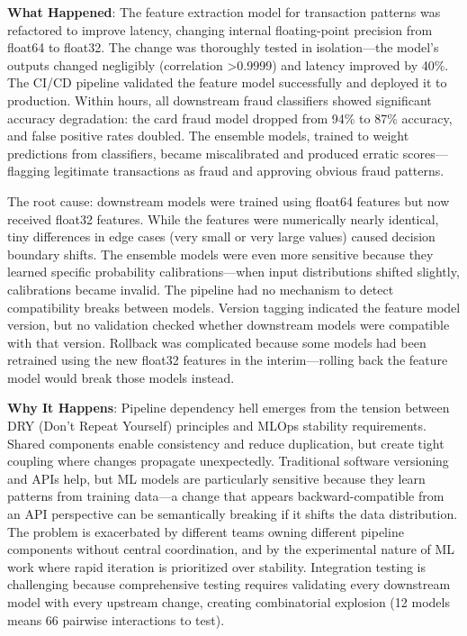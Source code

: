 \textbf{What Happened}: The feature extraction model for transaction patterns was refactored to improve latency, changing internal floating-point precision from float64 to float32. The change was thoroughly tested in isolation---the model's outputs changed negligibly (correlation >0.9999) and latency improved by 40\%. The CI/CD pipeline validated the feature model successfully and deployed it to production. Within hours, all downstream fraud classifiers showed significant accuracy degradation: the card fraud model dropped from 94\% to 87\% accuracy, and false positive rates doubled. The ensemble models, trained to weight predictions from classifiers, became miscalibrated and produced erratic scores---flagging legitimate transactions as fraud and approving obvious fraud patterns.

The root cause: downstream models were trained using float64 features but now received float32 features. While the features were numerically nearly identical, tiny differences in edge cases (very small or very large values) caused decision boundary shifts. The ensemble models were even more sensitive because they learned specific probability calibrations---when input distributions shifted slightly, calibrations became invalid. The pipeline had no mechanism to detect compatibility breaks between models. Version tagging indicated the feature model version, but no validation checked whether downstream models were compatible with that version. Rollback was complicated because some models had been retrained using the new float32 features in the interim---rolling back the feature model would break those models instead.

\textbf{Why It Happens}: Pipeline dependency hell emerges from the tension between DRY (Don't Repeat Yourself) principles and MLOps stability requirements. Shared components enable consistency and reduce duplication, but create tight coupling where changes propagate unexpectedly. Traditional software versioning and APIs help, but ML models are particularly sensitive because they learn patterns from training data---a change that appears backward-compatible from an API perspective can be semantically breaking if it shifts the data distribution. The problem is exacerbated by different teams owning different pipeline components without central coordination, and by the experimental nature of ML work where rapid iteration is prioritized over stability. Integration testing is challenging because comprehensive testing requires validating every downstream model with every upstream change, creating combinatorial explosion (12 models means 66 pairwise interactions to test).


